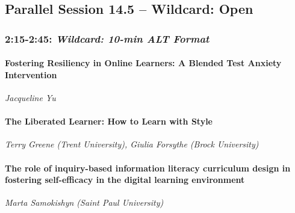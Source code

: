 \documentclass[
]{book}
\begin{document}
\hypertarget{parallel-session-14.5-wildcard-open}{%
\subsection*{Parallel Session 14.5 -- Wildcard: Open}\label{parallel-session-14.5-wildcard-open}}

\hypertarget{wildcard-10-min-alt-format}{%
\subsubsection*{\texorpdfstring{2:15-2:45: \emph{Wildcard: 10-min ALT Format}}{2:15-2:45: Wildcard: 10-min ALT Format}}\label{wildcard-10-min-alt-format}}

\begin{secondary}
\hypertarget{fostering-resiliency-in-online-learners-a-blended-test-anxiety-intervention}{%
\paragraph{Fostering Resiliency in Online Learners: A Blended Test
Anxiety
Intervention}\label{fostering-resiliency-in-online-learners-a-blended-test-anxiety-intervention}}

\emph{Jacqueline Yu}
\end{secondary}

\begin{secondary}
\hypertarget{the-liberated-learner-how-to-learn-with-style}{%
\paragraph{The Liberated Learner: How to Learn with
Style}\label{the-liberated-learner-how-to-learn-with-style}}

\emph{Terry Greene (Trent University), Giulia Forsythe (Brock
University)}
\end{secondary}

\begin{secondary}
\hypertarget{the-role-of-inquiry-based-information-literacy-curriculum-design-in-fostering-self-efficacy-in-the-digital-learning-environment}{%
\paragraph{The role of inquiry-based information literacy curriculum
design in fostering self-efficacy in the digital learning
environment}\label{the-role-of-inquiry-based-information-literacy-curriculum-design-in-fostering-self-efficacy-in-the-digital-learning-environment}}

\emph{Marta Samokishyn (Saint Paul University)}
\end{secondary}
\end{document}

